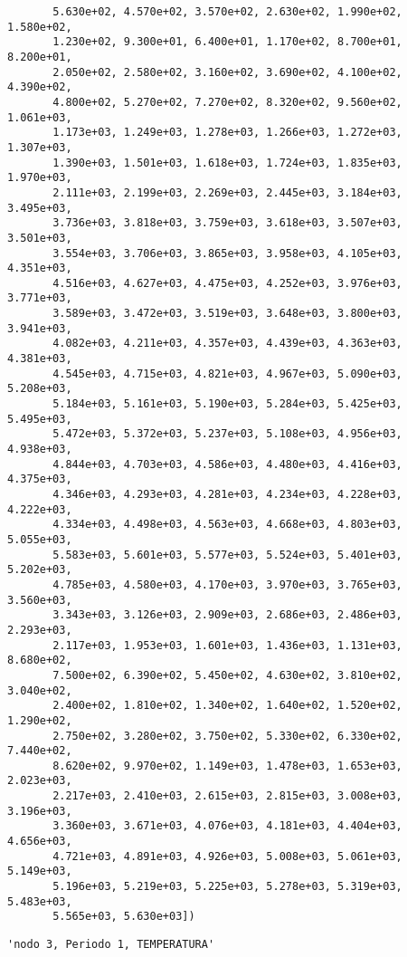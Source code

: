 \documentclass[11pt]{article}
\begin{document}
\begin{verbatim}
       5.630e+02, 4.570e+02, 3.570e+02, 2.630e+02, 1.990e+02, 1.580e+02,
       1.230e+02, 9.300e+01, 6.400e+01, 1.170e+02, 8.700e+01, 8.200e+01,
       2.050e+02, 2.580e+02, 3.160e+02, 3.690e+02, 4.100e+02, 4.390e+02,
       4.800e+02, 5.270e+02, 7.270e+02, 8.320e+02, 9.560e+02, 1.061e+03,
       1.173e+03, 1.249e+03, 1.278e+03, 1.266e+03, 1.272e+03, 1.307e+03,
       1.390e+03, 1.501e+03, 1.618e+03, 1.724e+03, 1.835e+03, 1.970e+03,
       2.111e+03, 2.199e+03, 2.269e+03, 2.445e+03, 3.184e+03, 3.495e+03,
       3.736e+03, 3.818e+03, 3.759e+03, 3.618e+03, 3.507e+03, 3.501e+03,
       3.554e+03, 3.706e+03, 3.865e+03, 3.958e+03, 4.105e+03, 4.351e+03,
       4.516e+03, 4.627e+03, 4.475e+03, 4.252e+03, 3.976e+03, 3.771e+03,
       3.589e+03, 3.472e+03, 3.519e+03, 3.648e+03, 3.800e+03, 3.941e+03,
       4.082e+03, 4.211e+03, 4.357e+03, 4.439e+03, 4.363e+03, 4.381e+03,
       4.545e+03, 4.715e+03, 4.821e+03, 4.967e+03, 5.090e+03, 5.208e+03,
       5.184e+03, 5.161e+03, 5.190e+03, 5.284e+03, 5.425e+03, 5.495e+03,
       5.472e+03, 5.372e+03, 5.237e+03, 5.108e+03, 4.956e+03, 4.938e+03,
       4.844e+03, 4.703e+03, 4.586e+03, 4.480e+03, 4.416e+03, 4.375e+03,
       4.346e+03, 4.293e+03, 4.281e+03, 4.234e+03, 4.228e+03, 4.222e+03,
       4.334e+03, 4.498e+03, 4.563e+03, 4.668e+03, 4.803e+03, 5.055e+03,
       5.583e+03, 5.601e+03, 5.577e+03, 5.524e+03, 5.401e+03, 5.202e+03,
       4.785e+03, 4.580e+03, 4.170e+03, 3.970e+03, 3.765e+03, 3.560e+03,
       3.343e+03, 3.126e+03, 2.909e+03, 2.686e+03, 2.486e+03, 2.293e+03,
       2.117e+03, 1.953e+03, 1.601e+03, 1.436e+03, 1.131e+03, 8.680e+02,
       7.500e+02, 6.390e+02, 5.450e+02, 4.630e+02, 3.810e+02, 3.040e+02,
       2.400e+02, 1.810e+02, 1.340e+02, 1.640e+02, 1.520e+02, 1.290e+02,
       2.750e+02, 3.280e+02, 3.750e+02, 5.330e+02, 6.330e+02, 7.440e+02,
       8.620e+02, 9.970e+02, 1.149e+03, 1.478e+03, 1.653e+03, 2.023e+03,
       2.217e+03, 2.410e+03, 2.615e+03, 2.815e+03, 3.008e+03, 3.196e+03,
       3.360e+03, 3.671e+03, 4.076e+03, 4.181e+03, 4.404e+03, 4.656e+03,
       4.721e+03, 4.891e+03, 4.926e+03, 5.008e+03, 5.061e+03, 5.149e+03,
       5.196e+03, 5.219e+03, 5.225e+03, 5.278e+03, 5.319e+03, 5.483e+03,
       5.565e+03, 5.630e+03])
    \end{verbatim}

    
    
    \begin{verbatim}
'nodo 3, Periodo 1, TEMPERATURA'
    \end{verbatim}

    
    
\end{document}
